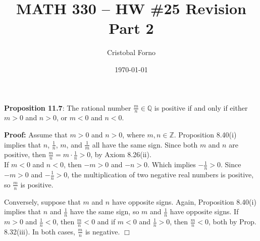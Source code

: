 \documentclass[12pt]{article}
\title{MATH 330 -- HW \#25 Revision Part 2}
\author{Cristobal Forno}
\date{\today}
\begin{document}
\maketitle

\textbf{Proposition 11.7}: The rational number $\frac{m}{n} \in \mathbb{Q}$ is
positive if and only if either $m > 0$ and $n > 0$, or $m < 0$ and $n < 0$.

\textbf{Proof:} Assume that $m > 0$ and $n > 0$, where $m, n \in \mathbb{Z}$.
Proposition 8.40(i) implies that $n$, $\frac{1}{n}$, $m$, and $\frac{1}{m}$ all
have the same sign. Since both $m$ and $n$ are positive, then $\frac{m}{n} = m \cdot
\frac{1}{n} > 0$, by Axiom 8.26(ii). \\
\indent
If $m < 0$ and $n < 0$, then $-m > 0$ and $-n > 0$. Which implies $-\frac{1}{n}
> 0$. Since  $-m > 0$ and $-\frac{1}{n} > 0$, the multiplication of two negative
real numbers is positive, so $\frac{m}{n}$ is positive.


Conversely, suppose that $m$ and $n$ have opposite signs. Again, Proposition
8.40(i) implies that $n$ and $\frac{1}{n}$ have the same sign, so $m$ and
$\frac{1}{n}$ have opposite signs. If $m > 0$ and $\frac{1}{n} < 0$, then
$\frac{m}{n} < 0$ and if $m < 0$ and $\frac{1}{n} > 0$, then $\frac{m}{n} < 0$,
both by Prop. 8.32(iii). In both cases, $\frac{m}{n}$ is negative. $\Box$
\end{document}

